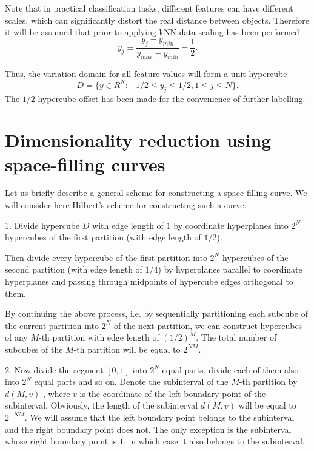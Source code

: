 \documentclass[sensors,article,submit,moreauthors,pdftex]{Definitions/mdpi}
\begin{document}
Note that in practical classification tasks, different features can have different scales, which can significantly distort the real distance between objects. Therefore it will be assumed that prior to applying kNN data scaling has been performed 
\begin{equation}
y_j \equiv \frac{y_j - y_{min}} {y_{max} - y_{min}} - \frac{1} {2}.
\end{equation} 

Thus, the variation domain for all feature values will form a unit hypercube
\begin{equation}\label{D}
D = \{ y \in R^N: -1/2 \leq y_j \leq 1/2,  1 \leq j \leq N \}.
\end{equation} 
The $1/2$ hypercube offset  has been made for the convenience of further labelling.

\section{Dimensionality reduction using space-filling curves}

Let us briefly describe a general scheme for constructing a space-filling curve. We will consider here Hilbert's scheme for constructing such a curve.


1. Divide hypercube $D$ with edge length of $1$ by coordinate hyperplanes into $2^N$ hypercubes of the first partition (with edge length of $1/2$).

Then divide every hypercube of the first partition into $2^N$  hypercubes of the second partition (with edge length of $1/4$) by hyperplanes parallel to coordinate hyperplanes and passing through midpoints of hypercube edges orthogonal to them.

By continuing the above process, i.e. by sequentially partitioning each subcube of the current partition into $2^N$ of the next partition, we can construct hypercubes of any $M$-th partition with edge length of $(1/2)^M$. The total number of subcubes of the $M$-th partition will be equal to $2^{NM}$.

2. Now divide the segment $[0, 1]$ into $2^N$ equal parts, divide  each of them also into $2^N$ equal parts and so on. Denote the subinterval of the $M$-th partition by $d(M,v)$ , where $v$ is the coordinate of the left boundary point of the subinterval. Obviously, the length of the subinterval $d(M,v)$ will be equal to $2^{-NM}$. We will assume that the left boundary point belongs to the subinterval and the right boundary point does not. The only exception is the subinterval whose right boundary point is $1$, in which case it also belongs to the subinterval.
\end{document}
